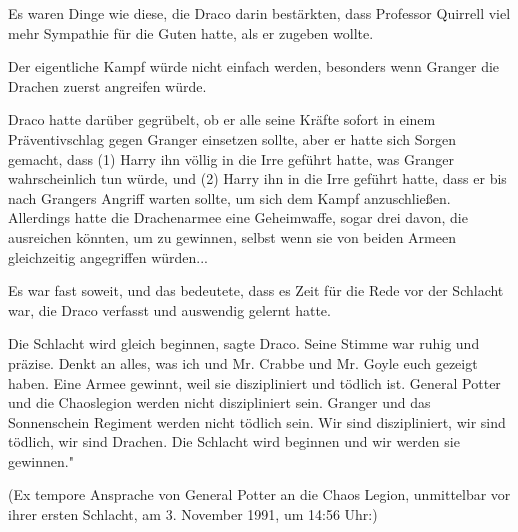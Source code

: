 Es waren Dinge wie diese, die Draco darin bestärkten, dass Professor Quirrell
viel mehr Sympathie für die Guten hatte, als er zugeben wollte.

Der eigentliche Kampf würde nicht einfach werden, besonders wenn Granger die
Drachen zuerst angreifen würde.

Draco hatte darüber gegrübelt, ob er alle seine Kräfte sofort in einem
Präventivschlag gegen Granger einsetzen sollte, aber er hatte sich Sorgen
gemacht, dass (1) Harry ihn völlig in die Irre geführt hatte, was Granger
wahrscheinlich tun würde, und (2) Harry ihn in die Irre geführt hatte, dass er
bis nach Grangers Angriff warten sollte, um sich dem Kampf anzuschließen.
Allerdings hatte die Drachenarmee eine Geheimwaffe, sogar drei davon, die
ausreichen könnten, um zu gewinnen, selbst wenn sie von beiden Armeen
gleichzeitig angegriffen würden...

Es war fast soweit, und das bedeutete, dass es Zeit für die Rede vor der
Schlacht war, die Draco verfasst und auswendig gelernt hatte.

\glqq{}Die Schlacht wird gleich beginnen\grqq{}, sagte Draco. Seine Stimme war
ruhig und präzise. \glqq{}Denkt an alles, was ich und Mr. Crabbe und Mr. Goyle
euch gezeigt haben. Eine Armee gewinnt, weil sie diszipliniert und tödlich ist.
General Potter und die Chaoslegion werden nicht diszipliniert sein. Granger und
das Sonnenschein Regiment werden nicht tödlich sein. Wir sind diszipliniert, wir
sind tödlich, wir sind Drachen. Die Schlacht wird beginnen und wir werden sie
gewinnen."

(Ex tempore Ansprache von General Potter an die Chaos Legion, unmittelbar vor
ihrer ersten Schlacht, am 3. November 1991, um 14:56 Uhr:)

